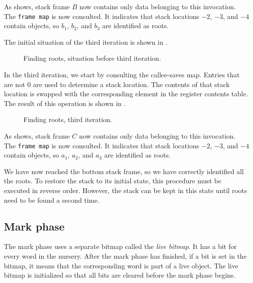 As  shows, stack frame $B$ now
contains only data belonging to this invocation.  The \texttt{frame
  map} is now consulted.  It indicates that stack locations $-2$,
$-3$, and $-4$ contain \commonlisp{} objects, so $b_1$, $b_2$, and
$b_3$ are identified as roots.

The initial situation of the third iteration is shown in
.

\begin{figure}
\begin{center}
\end{center}
\caption{\label{fig-root-finding-example-3}
Finding roots, situation before third iteration.}
\end{figure}

In the third iteration, we start by consulting the callee-saves map.
Entries that are not $0$ are used to determine a stack location.  The
contents of that stack location is swapped with the corresponding
element in the register contents table.  The result of this operation
is shown in .

\begin{figure}
\begin{center}
\end{center}
\caption{\label{fig-root-finding-example-3b}
Finding roots, third iteration.}
\end{figure}

As  shows, stack frame $C$ now
contains only data belonging to this invocation.  The \texttt{frame
  map} is now consulted.  It indicates that stack locations $-2$,
$-3$, and $-4$ contain \commonlisp{} objects, so $a_1$, $a_2$, and
$a_3$ are identified as roots.

We have now reached the bottom stack frame, so we have correctly
identified all the roots.  To restore the stack to its initial state,
this procedure must be executed in reverse order.  However, the stack
can be kept in this state until roots need to be found a second time.

\subsection{Mark phase}

The mark phase uses a separate bitmap called the \emph{live bitmap}.
It has a bit for every word in the nursery.  After the mark phase has
finished, if a bit is set in the bitmap, it means that the
corresponding word is part of a live object.  The live bitmap is
initialized so that all bits are cleared before the mark phase begins.

